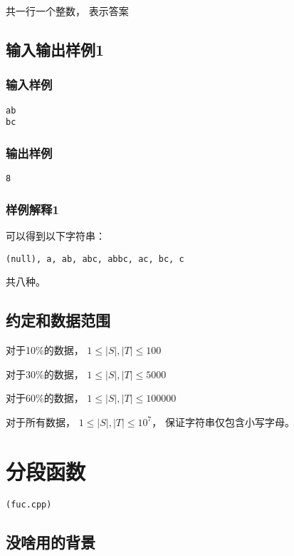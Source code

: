 \documentclass[UTF8]{ctexart}
\begin{document}
共一行一个整数， 表示答案

\subsection{输入输出样例1}

\subsubsection{输入样例}

\begin{lstlisting}
ab
bc
\end{lstlisting}

\subsubsection{输出样例}

\begin{lstlisting}
8
\end{lstlisting}

\subsubsection{样例解释1}

可以得到以下字符串：

\begin{lstlisting}
(null), a, ab, abc, abbc, ac, bc, c
\end{lstlisting}

共八种。

\subsection{约定和数据范围}

对于10\%的数据， $1\le |S|,|T| \le100$

对于30\%的数据， $1\le |S|,|T| \le 5000$

对于60\%的数据， $1\le |S|,|T| \le 100000$

对于所有数据， $1\le |S|,|T| \le 10^7$， 保证字符串仅包含小写字母。

\newpage
\section{分段函数}
\begin{center}
\tt\large{(fuc.cpp)}
\end{center}

\subsection{没啥用的背景}
\end{document}

